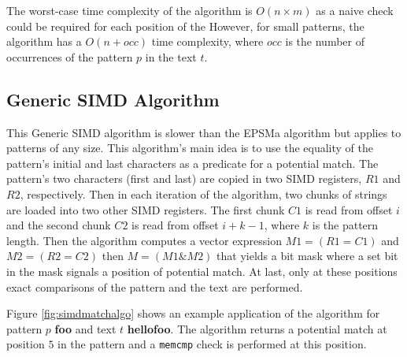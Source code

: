 The worst-case time complexity of the algorithm is $O(n \times m)$ as a naive check could be required for each position of the  However, for small patterns, the algorithm has a $O(n+occ)$ time complexity, where $occ$ is the number of occurrences of the pattern $p$ in the text $t$.


\subsection{Generic SIMD Algorithm}
This Generic SIMD algorithm \cite{simdalgo} is slower than the EPSMa algorithm but applies to patterns of any size. This algorithm's main idea is to use the equality of the pattern's initial and last characters as a predicate for a potential match. The pattern's two characters (first and last) are copied in two SIMD registers, $R1$ and $R2$, respectively. Then in each iteration of the algorithm, two chunks of strings are loaded into two other SIMD registers. The first chunk $C1$ is read from offset $i$ and the second chunk $C2$ is read from offset $i + k - 1$, where $k$ is the pattern length. Then the algorithm computes a vector expression $M1 = (R1 = C1)$ and $M2 = (R2 = C2)$ then $M = (M1 \& M2)$ that yields a bit mask where a set bit in the mask signals a position of potential match. At last, only at these positions exact comparisons of the pattern and the text are performed.

Figure \ref{fig:simdmatchalgo} shows an example application of the algorithm for pattern $p$ \textbf{foo} and text $t$ \textbf{hellofoo}. The algorithm returns a potential match at position $5$ in the pattern and a \texttt{memcmp} check is performed at this position.

